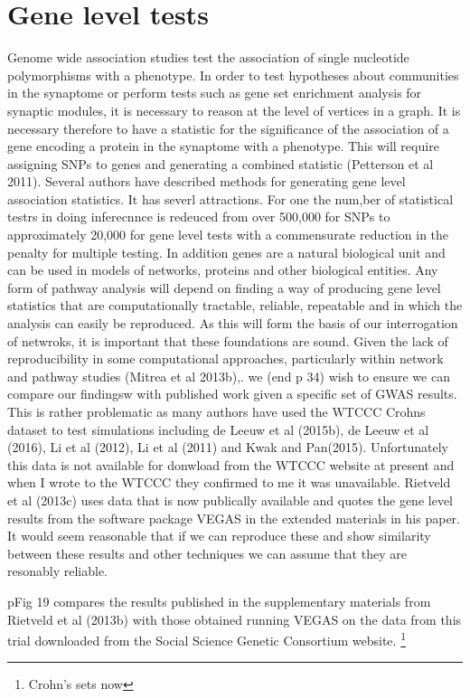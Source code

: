 \section{Gene level tests}

Genome wide association studies test the association of single nucleotide polymorphisms with a phenotype.
In order to test hypotheses about communities in the synaptome or perform tests such as gene set enrichment analysis for synaptic modules, it is necessary to reason at the level of vertices in a graph. It is necessary therefore to have a statistic for the significance of the association of a gene encoding a protein in the synaptome with a phenotype. This will require assigning SNPs to genes and generating a combined statistic (Petterson et al 2011).
Several authors have described methods for generating gene level association statistics. It has severl attractions. For one the num,ber of statistical testrs in doing inferecnnce is redeuced from over 500,000 for SNPs to approximately 20,000 for gene level tests with a commensurate reduction in the penalty for multiple testing. In addition genes are a natural biological unit and can be used in models of networks, proteins and other biological entities. Any form of pathway analysis will depend on finding a way of producing gene level statistics that are computationally tractable, reliable, repeatable and in which the analysis can easily be reproduced. As this will form the basis of our interrogation of netwroks, it is important that these foundations are sound. Given the lack of reproducibility in some computational approaches, particularly within network and pathway studies (Mitrea et al 2013b),. we (end p 34)
wish to ensure we can compare our findingsw with published work given a specific set of GWAS results.
This is rather problematic as many authors have used the WTCCC Crohns dataset to test simulations including de Leeuw et al (2015b), de Leeuw et al (2016), Li et al (2012), Li et al (2011) and Kwak and Pan(2015). Unfortunately this data is not available for donwload from the WTCCC website at present and when I wrote to the WTCCC they confirmed to me it was unavailable. Rietveld et al (2013c) uses data that is now publically available and quotes the gene level results from the software package VEGAS in the extended materials in his paper. It would seem reasonable that if we can reproduce these and show similarity between these results and other techniques we can assume that they are resonably reliable.

pFig 19 compares the results published in the supplementary materials from Rietveld et al (2013b) with those obtained running VEGAS on the data from this trial downloaded from the Social Science Genetic Consortium website. \footnote{Crohn's sets now}

